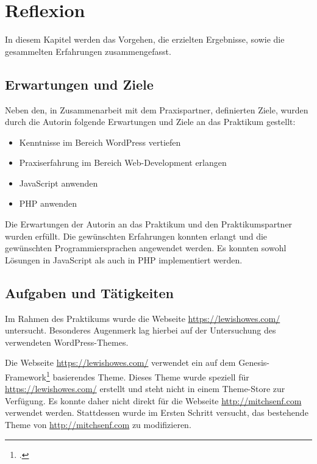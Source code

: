 
\chapter{Reflexion}

In diesem Kapitel werden das Vorgehen, die erzielten Ergebnisse, sowie die gesammelten Erfahrungen zusammengefasst.


\section{Erwartungen und Ziele}


Neben den, in Zusammenarbeit mit dem Praxispartner, definierten Ziele, wurden durch die Autorin folgende Erwartungen und Ziele an das Praktikum gestellt:

\begin{itemize}
	\item Kenntnisse im Bereich WordPress vertiefen
	\item Praxiserfahrung im Bereich Web-Development erlangen
	\item JavaScript anwenden
	\item PHP anwenden
\end{itemize}

Die Erwartungen der Autorin an das Praktikum und den Praktikumspartner wurden erfüllt. Die gewünschten Erfahrungen konnten erlangt und die gewünschten Programmiersprachen angewendet werden. Es konnten sowohl Lösungen in JavaScript als auch in PHP implementiert werden.


\section{Aufgaben und Tätigkeiten}


Im Rahmen des Praktikums wurde die Webseite \url{https://lewishowes.com/} untersucht. Besonderes Augenmerk lag hierbei auf der Untersuchung des verwendeten WordPress-Themes.

Die Webseite \url{https://lewishowes.com/} verwendet ein auf dem Genesis-Framework\footcite{genesis-theme} basierendes Theme. Dieses Theme wurde speziell für \url{https://lewishowes.com/} erstellt und steht nicht in einem Theme-Store zur Verfügung. Es konnte daher nicht direkt für die Webseite \url{http://mitchsenf.com} verwendet werden. Stattdessen wurde im Ersten Schritt versucht, das bestehende Theme von \url{http://mitchsenf.com} zu modifizieren.

